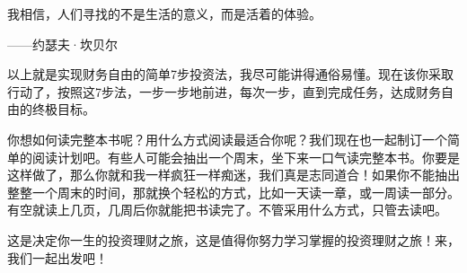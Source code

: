 \begin{BookQuote}
我相信，人们寻找的不是生活的意义，而是活着的体验。

\hfill ——约瑟夫·坎贝尔
\end{BookQuote}

以上就是实现财务自由的简单7步投资法，我尽可能讲得通俗易懂。现在该你采取行动了，按照这7步法，一步一步地前进，每次一步，直到完成任务，达成财务自由的终极目标。

你想如何读完整本书呢？用什么方式阅读最适合你呢？我们现在也一起制订一个简单的阅读计划吧。有些人可能会抽出一个周末，坐下来一口气读完整本书。你要是这样做了，那么你就和我一样疯狂一样痴迷，我们真是志同道合！如果你不能抽出整整一个周末的时间，那就换个轻松的方式，比如一天读一章，或一周读一部分。有空就读上几页，几周后你就能把书读完了。不管采用什么方式，只管去读吧。

这是决定你一生的投资理财之旅，这是值得你努力学习掌握的投资理财之旅！来，我们一起出发吧！
